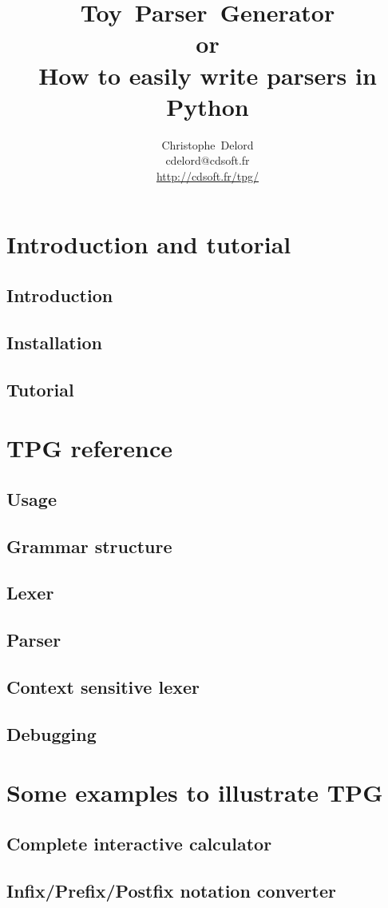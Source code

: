 \documentclass[a4paper,twoside]{report}
\author{
    Christophe~Delord\\
    cdelord@cdsoft.fr \\
    \url{http://cdsoft.fr/tpg/} \\
}
\title{
    Toy~Parser~Generator \\
    or\\
    How to easily write parsers in Python \\
}
\begin{document}
\maketitle
\tableofcontents

\listoffigures

\cleardoublepage
\part{Introduction and tutorial}                            \label{tpg:intro}
    \chapter{Introduction}
        
    \chapter{Installation}
        
    \chapter{Tutorial}                                      \label{tpg:tutorial}
        

\cleardoublepage
\part{TPG reference}                                        \label{tpg:core}
    \chapter{Usage}
        
    \chapter{Grammar structure}
        
    \chapter{Lexer}
        
    \chapter{Parser}
        
    \chapter{Context sensitive lexer}                       \label{tpg:CSL}
        
    \chapter{Debugging}
        

\cleardoublepage
\part{Some examples to illustrate TPG}                      \label{tpg:examples}
    \chapter{Complete interactive calculator}
        
    \chapter{Infix/Prefix/Postfix notation converter}
        
\end{document}
